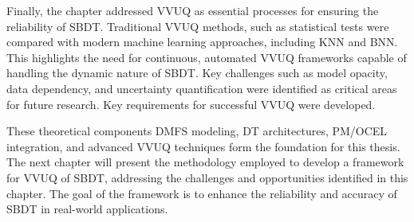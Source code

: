 Finally, the chapter addressed VVUQ as essential processes for ensuring the reliability of SBDT. Traditional VVUQ methods, such as statistical tests were compared with modern machine learning approaches, including KNN and BNN. This highlights the need for continuous, automated VVUQ frameworks capable of handling the dynamic nature of SBDT. Key challenges such as model opacity, data dependency, and uncertainty quantification were identified as critical areas for future research. Key requirements for successful VVUQ were developed.

These theoretical components \textemdash DMFS modeling, DT architectures, PM/OCEL integration, and advanced VVUQ techniques \textemdash form the foundation for this thesis. The next chapter will present the methodology employed to develop a framework for VVUQ of SBDT, addressing the challenges and opportunities identified in this chapter. The goal of the framework is to enhance the reliability and accuracy of SBDT in real-world applications.




